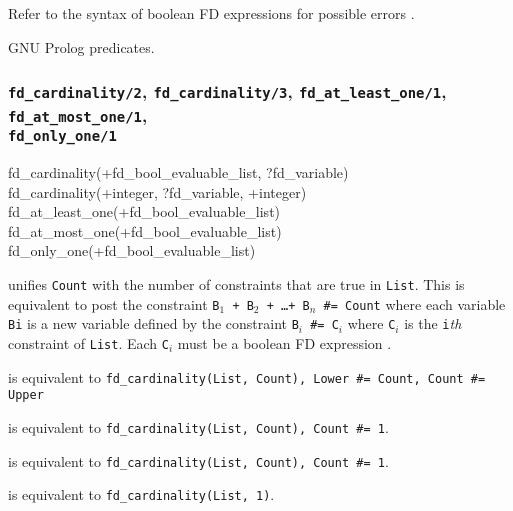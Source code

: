 \Errors

Refer to the syntax of boolean FD expressions for possible errors
.

\Portability

GNU Prolog predicates.

\subsubsection{\texttt{fd\_cardinality/2},
\texttt{fd\_cardinality/3},
\texttt{fd\_at\_least\_one/1},
\texttt{fd\_at\_most\_one/1}, \\
\texttt{fd\_only\_one/1}}
\label{fd-cardinality/2}

\begin{TemplatesOneCol}
fd\_cardinality(+fd\_bool\_evaluable\_list, ?fd\_variable)\\
fd\_cardinality(+integer, ?fd\_variable, +integer)\\
fd\_at\_least\_one(+fd\_bool\_evaluable\_list)\\
fd\_at\_most\_one(+fd\_bool\_evaluable\_list)\\
fd\_only\_one(+fd\_bool\_evaluable\_list)

\end{TemplatesOneCol}

\Description

 unifies \texttt{Count} with the number
of constraints that are true in \texttt{List}. This is equivalent to post
the constraint \texttt{B$_{1}$ + B$_{2}$ + \ldots + B$_{n}$ \#= Count}
where each variable \texttt{Bi} is a new variable defined by the constraint
\texttt{B$_{i}$ \#{\lt}={\gt} C$_{i}$} where \texttt{C$_{i}$} is the
\texttt{i}\emph{th} constraint of \texttt{List}. Each \texttt{C$_{i}$}
must be a boolean FD expression .

 is equivalent to
\texttt{fd\_cardinality(List, Count), Lower \#={\lt} Count, Count \#={\lt}
Upper}

 is equivalent to
\texttt{fd\_cardinality(List, Count), Count \#{\gt}= 1}.

 is equivalent to
\texttt{fd\_cardinality(List, Count), Count \#={\lt} 1}.

 is equivalent to \texttt{fd\_cardinality(List,
1)}.

